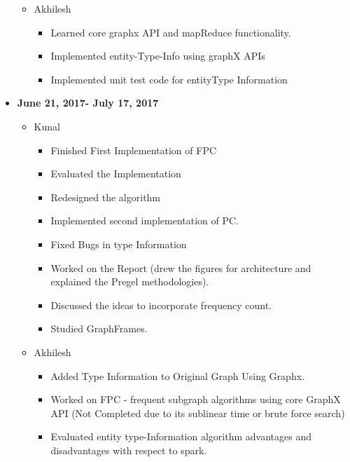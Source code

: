 \documentclass{easychair}
\begin{document}
\begin{itemize}
\begin{itemize}
\begin{itemize}
 \end{itemize}
 
 \item Akhilesh
  \begin{itemize}
   \item Learned core graphx API and mapReduce functionality.
\item Implemented entity-Type-Info using graphX APIs
\item Implemented unit test code for entityType Information 

 \end{itemize}

    \end{itemize}
    
     \item \textbf{June 21, 2017- July 17, 2017}
    \begin{itemize}
    
    \item Kunal 
    \begin{itemize}
    \item Finished First Implementation of FPC
\item Evaluated the Implementation
\item Redesigned the algorithm 
\item Implemented second implementation of PC.
\item Fixed Bugs in type Information
\item Worked on the  Report (drew the figures for architecture and explained the Pregel methodologies).
\item Discussed the ideas to incorporate frequency count. 
\item Studied GraphFrames.

 \end{itemize}
 
 \item Akhilesh
  \begin{itemize}
   \item Added Type Information to Original Graph Using Graphx.
\item Worked on FPC - frequent subgraph algorithms using core GraphX API  (Not Completed due to its sublinear time or brute force search)
\item Evaluated entity type-Information algorithm advantages and disadvantages with respect to spark.

 \end{itemize}


\end{itemize}
\end{itemize}
\end{document}
